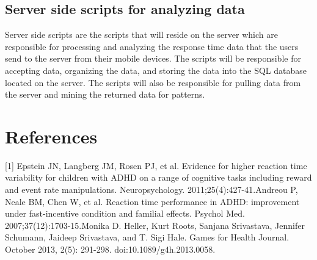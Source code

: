 \documentclass[a4wide]{article}
\begin{document}
\subsection{Server side scripts for analyzing data}
\- Server side scripts are the scripts that will reside on the server which are responsible for processing and analyzing the response time data that the users send to the server from their mobile devices. The scripts will be responsible for accepting data, organizing the data, and storing the data into the SQL database located on the server. The scripts will also be responsible for pulling data from the server and mining the returned data for patterns.  


\section{References}
[1] Epstein JN, Langberg JM, Rosen PJ, et al. Evidence for higher reaction time variability for children with ADHD on a range of cognitive tasks including reward and event rate manipulations. Neuropsychology. 2011;25(4):427-41.\newline
[2] Andreou P, Neale BM, Chen W, et al. Reaction time performance in ADHD: improvement under fast-incentive condition and familial effects. Psychol Med. 2007;37(12):1703-15.\newline
[3] Monika D. Heller, Kurt Roots, Sanjana Srivastava, Jennifer Schumann, Jaideep Srivastava, and T. Sigi Hale. Games for Health Journal. October 2013, 2(5): 291-298. doi:10.1089/g4h.2013.0058.\newline
\end{document}
